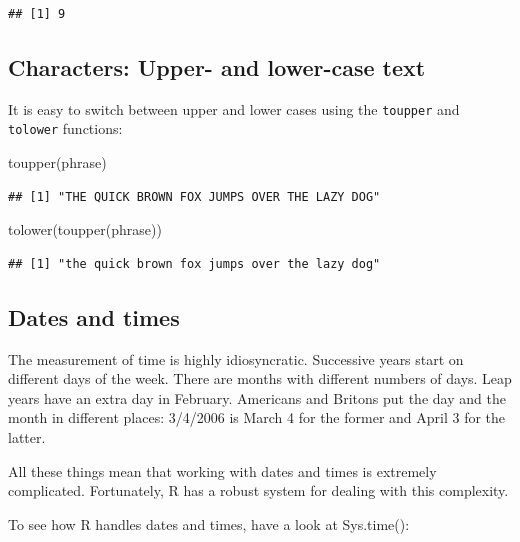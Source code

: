 \documentclass[
]{book}
\newenvironment{Shaded}{\begin{snugshade}}{\end{snugshade}}
\newcommand{\FunctionTok}[1]{\textcolor[rgb]{0.00,0.00,0.00}{#1}}
\newcommand{\NormalTok}[1]{#1}
\theoremstyle{definition}
\theoremstyle{definition}
\theoremstyle{definition}
\theoremstyle{definition}
\theoremstyle{remark}
\begin{document}
\begin{verbatim}
## [1] 9
\end{verbatim}

\hypertarget{characters-upper--and-lower-case-text}{%
\subsection{Characters: Upper- and lower-case text}\label{characters-upper--and-lower-case-text}}

It is easy to switch between upper and lower cases using the \texttt{toupper} and \texttt{tolower} functions:

\begin{Shaded}
\begin{Highlighting}[]
\FunctionTok{toupper}\NormalTok{(phrase)}
\end{Highlighting}
\end{Shaded}

\begin{verbatim}
## [1] "THE QUICK BROWN FOX JUMPS OVER THE LAZY DOG"
\end{verbatim}

\begin{Shaded}
\begin{Highlighting}[]
\FunctionTok{tolower}\NormalTok{(}\FunctionTok{toupper}\NormalTok{(phrase))}
\end{Highlighting}
\end{Shaded}

\begin{verbatim}
## [1] "the quick brown fox jumps over the lazy dog"
\end{verbatim}

\hypertarget{dates-and-times}{%
\subsection{Dates and times}\label{dates-and-times}}

The measurement of time is highly idiosyncratic. Successive years start on different days of the week. There are months with different numbers of days. Leap years have an extra day in February. Americans and Britons put the day and the month in different places: 3/4/2006 is March 4 for the former and April 3 for the latter.

All these things mean that working with dates and times is extremely complicated. Fortunately, R has a robust system for dealing with this complexity.

To see how R handles dates and times, have a look at Sys.time():
\end{document}
